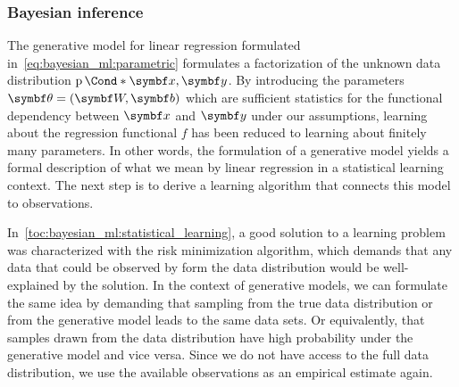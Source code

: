 \subsubsection{Bayesian inference}
The generative model for linear regression formulated in~\cref{eq:bayesian_ml:parametric} formulates a factorization of the unknown data distribution $\Prob*{\mat{x}, \mat{y}}$.
By introducing the parameters $\mat{\theta} = (\mat{W}, \mat{b})$ which are sufficient statistics for the functional dependency between $\mat{x}$ and $\mat{y}$ under our assumptions, learning about the regression functional $f$ has been reduced to learning about finitely many parameters.
In other words, the formulation of a generative model yields a formal description of what we mean by linear regression in a statistical learning context.
The next step is to derive a learning algorithm that connects this model to observations.

In~\cref{toc:bayesian_ml:statistical_learning}, a good solution to a learning problem was characterized with the risk minimization algorithm, which demands that any data that could be observed by form the data distribution would be well-explained by the solution.
In the context of generative models, we can formulate the same idea by demanding that sampling from the true data distribution or from the generative model leads to the same data sets.
Or equivalently, that samples drawn from the data distribution have high probability under the generative model and vice versa.
Since we do not have access to the full data distribution, we use the available observations as an empirical estimate again.

